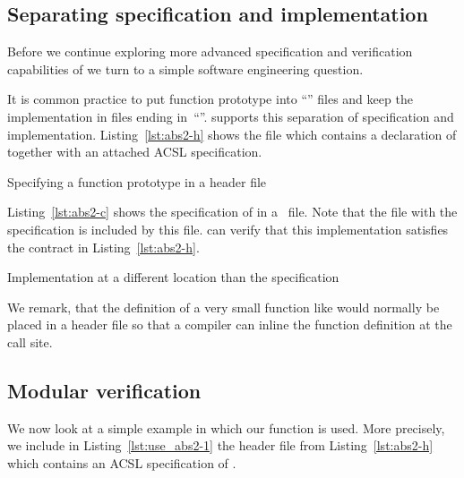 \clearpage

\subsection{Separating specification and implementation}

Before we continue exploring more advanced specification and verification
capabilities of \framacwp we turn to a simple software engineering question.

It is common practice to put function prototype into ``'' files and
keep the implementation in files ending in~``''.
\framacwp supports this separation of specification and implementation.
Listing~\ref{lst:abs2-h} shows the file  which contains
a declaration of  together with an attached ACSL specification.

\begin{listing}[hbt]
\begin{minipage}{\textwidth}

\end{minipage}
\caption{\label{lst:abs2-h} Specifying a function prototype in a header file}
\end{listing}

Listing~\ref{lst:abs2-c} shows the specification of  in a~ file.
Note that the file  with the specification is included by this file.
\framacwp can verify that this implementation satisfies the contract in
Listing~\ref{lst:abs2-h}.



\begin{listing}[hbt]
\begin{minipage}{\textwidth}

\end{minipage}
\caption{\label{lst:abs2-c} Implementation at a different location than the specification}
\end{listing}

We remark, that the definition of a very small function like  would normally
be placed in a header file so that a compiler can inline the function definition
at the call site.

\clearpage

\subsection{Modular verification}

We now look at a simple example in which our function  is used.
More precisely, we include in Listing~\ref{lst:use_abs2-1} the
header file from Listing~\ref{lst:abs2-h} which contains an ACSL specification of .

